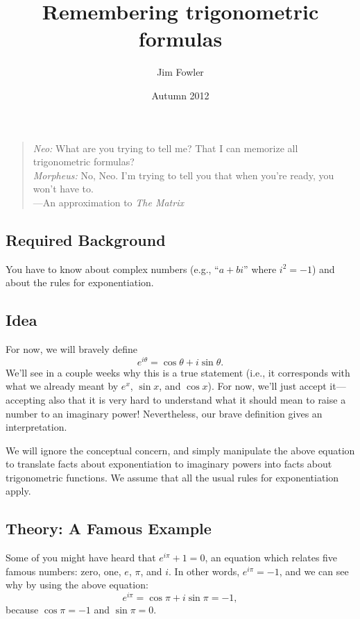 \documentclass[12pt]{handout}
\title{Remembering trigonometric formulas}
\author{Jim Fowler}
\date{Autumn 2012}
\begin{document}
\maketitle

\null\hfill\parbox{5.5in}{
\begin{verse}
\textit{Neo:} What are you trying to tell me? That I can memorize all trigonometric formulas? \\
\textit{Morpheus:} No, Neo. I'm trying to tell you that when you're ready, you won't have to. \\
\null\hfill ---An approximation to \textit{The Matrix}
\end{verse}}

\subsection*{Required Background}

You have to know about complex numbers (e.g., ``$a+bi$'' where $i^2 =
-1$) and about the rules for exponentiation.

\subsection*{Idea}

For now, we will bravely define
$$
e^{i\theta} = \cos \theta + i \sin \theta.
$$
We'll see in a couple weeks why this is a true statement (i.e., it
corresponds with what we already meant by $e^x$, $\sin x$, and $\cos
x$).  For now, we'll just accept it---accepting also that it is very
hard to understand what it should mean to raise a number to an
imaginary power!  Nevertheless, our brave definition gives an
interpretation.

We will ignore the conceptual concern, and simply manipulate the above
equation to translate facts about exponentiation to imaginary powers
into facts about trigonometric functions.  We assume that all the
usual rules for exponentiation apply.

\subsection*{Theory: A Famous Example}

Some of you might have heard that $e^{i\pi} + 1 = 0$, an equation
which relates five famous numbers: zero, one, $e$, $\pi$, and $i$.  In
other words, $e^{i\pi} = -1$, and we can see why by using the above
equation:
$$
e^{i \pi} = \cos \pi + i \sin \pi = -1,
$$
because $\cos \pi = -1$ and $\sin \pi = 0$.
\end{document}
